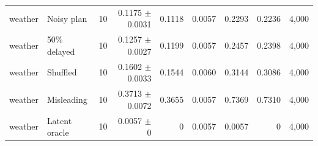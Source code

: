 \begin{table}[t]
\begin{tabular}{@{}llrrrrrrr@{}}
weather & Noisy plan & 10 & 0.1175 $\pm$ 0.0031 & 0.1118 & 0.0057 & 0.2293 & 0.2236 & 4,000 \\
weather & 50\% delayed & 10 & 0.1257 $\pm$ 0.0027 & 0.1199 & 0.0057 & 0.2457 & 0.2398 & 4,000 \\
weather & Shuffled & 10 & 0.1602 $\pm$ 0.0033 & 0.1544 & 0.0060 & 0.3144 & 0.3086 & 4,000 \\
weather & Misleading & 10 & 0.3713 $\pm$ 0.0072 & 0.3655 & 0.0057 & 0.7369 & 0.7310 & 4,000 \\
weather & Latent oracle & 10 & 0.0057 $\pm$ 0 & 0 & 0.0057 & 0.0057 & 0 & 4,000 \\
\bottomrule
\end{tabular}
\end{table}
